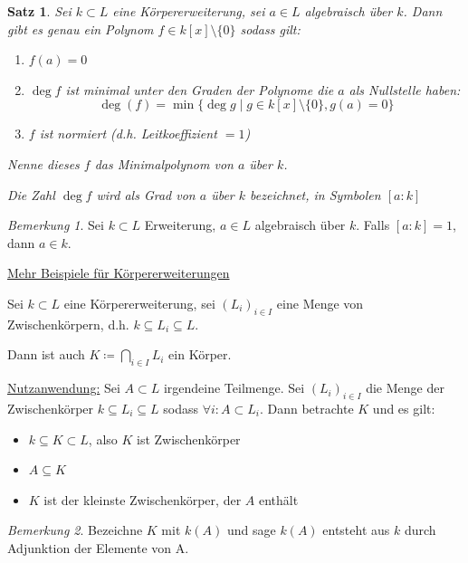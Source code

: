 \documentclass[a4paper,12pt,numbers=noenddot,parskip=full]{scrartcl}
\newcommand{\heading}{\underline}
\theoremstyle{dotless}
\newtheorem{theorem}{Satz}[section]
\theoremstyle{remark}
\newtheorem*{remark}{Bemerkung}
\begin{document}
	\begin{theorem}
		Sei $k \subset L$ eine Körpererweiterung, sei $a \in L$ algebraisch über $k$. Dann gibt es genau ein Polynom $f \in k[x] \setminus \{ 0 \}$ sodass gilt:
		\begin{enumerate}
			\item $f(a) = 0$
			\item $\deg f$ ist minimal unter den Graden der Polynome die $a$ als Nullstelle haben:
			\begin{equation*}
				\deg (f) = \min \{ \deg g \mid g \in k[x] \setminus \{0 \}, g(a) = 0 \}
			\end{equation*}
			\item $f$ ist normiert (d.h. Leitkoeffizient $= 1$)
		\end{enumerate}
		Nenne dieses $f$ das \emph{Minimalpolynom} von $a$ über $k$.
		
		Die Zahl $\deg f$ wird als \emph{Grad} von $a$ über $k$ bezeichnet, in Symbolen $[a: k]$
	\end{theorem}

	\begin{remark}
		Sei $k \subset L$ Erweiterung, $a \in L$ algebraisch über $k$. Falls $[a:k] = 1$, dann $a \in k$.
	\end{remark}

	\heading{Mehr Beispiele für Körpererweiterungen}
	
	Sei $k \subset L$ eine Körpererweiterung, sei $(L_i)_{i \in I}$ eine Menge von Zwischenkörpern, d.h. $k \subseteq L_i \subseteq L$.
	
	Dann ist auch $K \coloneqq \bigcap_{i \in I} L_i$ ein Körper.
	
	\heading{Nutzanwendung:} Sei $A \subset L$ irgendeine Teilmenge. Sei $(L_i)_{i \in I}$ die Menge der Zwischenkörper $k \subseteq L_i \subseteq L$ sodass $\forall i: A \subset L_i$. Dann betrachte $K$ und es gilt:
	\begin{itemize}
		\item $k \subseteq K \subset L$, also $K$ ist Zwischenkörper
		\item $A \subseteq K$
		\item $K$ ist der kleinste Zwischenkörper, der $A$ enthält
	\end{itemize}

	\begin{remark}
		Bezeichne $K$ mit $k(A)$ und sage $k(A)$ entsteht aus $k$ durch Adjunktion der Elemente von A.
	\end{remark}
\end{document}
